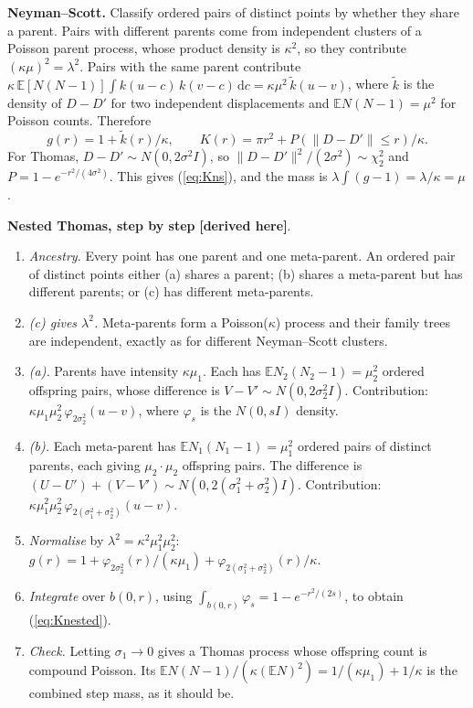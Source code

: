 \documentclass[10pt,a4paper]{article}
\newcommand{\derived}{\textcolor{green!45!black}{\textbf{[derived here]}}}
\newcommand{\E}{\mathbb{E}}
\newcommand{\dd}{\,\mathrm{d}}
\begin{document}
\textbf{Neyman--Scott.} Classify ordered pairs of distinct points by whether they share a parent. Pairs with different parents come from independent clusters of a Poisson parent process, whose product density is $\kappa^2$, so they contribute $(\kappa\mu)^2=\lambda^2$. Pairs with the same parent contribute
$\kappa\,\E[N(N-1)]\int k(u-c)\,k(v-c)\dd c=\kappa\mu^2\,\tilde k(u-v)$,
where $\tilde k$ is the density of $D-D'$ for two independent displacements and $\E N(N-1)=\mu^2$ for Poisson counts. Therefore
\begin{equation}
g(r)=1+\tilde k(r)/\kappa,\qquad K(r)=\pi r^2+P(\|D-D'\|\le r)/\kappa .
\label{eq:gns}
\end{equation}
For Thomas, $D-D'\sim N(0,2\sigma^2I)$, so $\|D-D'\|^2/(2\sigma^2)\sim\chi^2_2$ and $P=1-e^{-r^2/(4\sigma^2)}$. This gives (\ref{eq:Kns}), and the mass is $\lambda\int(g-1)=\lambda/\kappa=\mu$.

\textbf{Nested Thomas, step by step} \derived{}.
\begin{enumerate}
\item \emph{Ancestry.} Every point has one parent and one meta-parent. An ordered pair of distinct points either (a) shares a parent; (b) shares a meta-parent but has different parents; or (c) has different meta-parents.
\item \emph{(c) gives $\lambda^2$.} Meta-parents form a Poisson($\kappa$) process and their family trees are independent, exactly as for different Neyman--Scott clusters.
\item \emph{(a).} Parents have intensity $\kappa\mu_1$. Each has $\E N_2(N_2-1)=\mu_2^2$ ordered offspring pairs, whose difference is $V-V'\sim N(0,2\sigma_2^2I)$. Contribution: $\kappa\mu_1\mu_2^2\,\varphi_{2\sigma_2^2}(u-v)$, where $\varphi_s$ is the $N(0,sI)$ density.
\item \emph{(b).} Each meta-parent has $\E N_1(N_1-1)=\mu_1^2$ ordered pairs of distinct parents, each giving $\mu_2\cdot\mu_2$ offspring pairs. The difference is $(U-U')+(V-V')\sim N(0,2(\sigma_1^2+\sigma_2^2)I)$. Contribution: $\kappa\mu_1^2\mu_2^2\,\varphi_{2(\sigma_1^2+\sigma_2^2)}(u-v)$.
\item \emph{Normalise} by $\lambda^2=\kappa^2\mu_1^2\mu_2^2$: $g(r)=1+\varphi_{2\sigma_2^2}(r)/(\kappa\mu_1)+\varphi_{2(\sigma_1^2+\sigma_2^2)}(r)/\kappa$.
\item \emph{Integrate} over $b(0,r)$, using $\int_{b(0,r)}\varphi_s=1-e^{-r^2/(2s)}$, to obtain (\ref{eq:Knested}).
\item \emph{Check.} Letting $\sigma_1\to0$ gives a Thomas process whose offspring count is compound Poisson. Its $\E N(N-1)/(\kappa(\E N)^2)=1/(\kappa\mu_1)+1/\kappa$ is the combined step mass, as it should be.
\end{enumerate}
\end{document}
